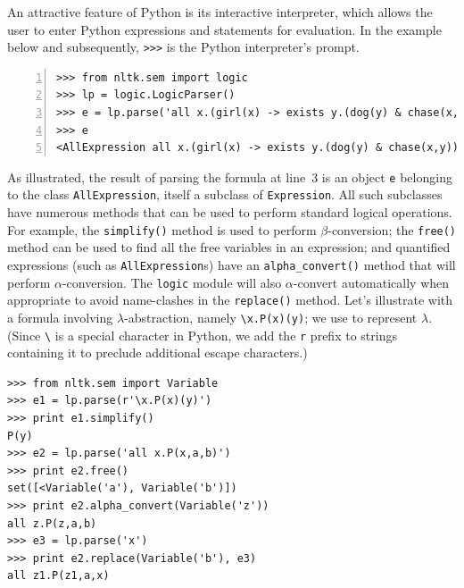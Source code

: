 \documentclass[11pt, a4paper]{article}
\newcommand{\dhgcode}[1]{{\tt #1}}
\begin{document}
An attractive feature of Python is its interactive interpreter,
which allows the user to enter Python expressions and statements for
evaluation. In the example below and subsequently, \verb!>>>! is the
Python interpreter's prompt. 
\begin{Verbatim}[numbers=left]
>>> from nltk.sem import logic
>>> lp = logic.LogicParser()
>>> e = lp.parse('all x.(girl(x) -> exists y.(dog(y) & chase(x,y)))')
>>> e
<AllExpression all x.(girl(x) -> exists y.(dog(y) & chase(x,y)))>
\end{Verbatim}
As illustrated, the result of parsing the formula at line~3 is an object
\texttt{e} belonging to the class \texttt{AllExpression}, itself a
subclass of \texttt{Expression}.  All such subclasses have numerous
methods that can be used to perform standard logical operations. For
example, the \dhgcode{simplify()} method is used to perform
$\beta$-conversion; the \dhgcode{free()} method can be used to find
all the free variables in an expression; and quantified expressions
(such as \texttt{AllExpression}s) have an \dhgcode{alpha\_convert()}
method that will perform $\alpha$-conversion.  The \texttt{logic}
module will also $\alpha$-convert automatically when appropriate to
avoid name-clashes in the \dhgcode{replace()} method. Let's illustrate
with a formula involving $\lambda$-abstraction, namely
\verb!\x.P(x)(y)!; we use \protect{\verb!\!} to represent
$\lambda$. (Since \verb!\! is a special character in Python,
we add the \texttt{r} prefix to strings containing it to preclude
additional escape characters.)
\begin{Verbatim}
>>> from nltk.sem import Variable
>>> e1 = lp.parse(r'\x.P(x)(y)')
>>> print e1.simplify()
P(y)
>>> e2 = lp.parse('all x.P(x,a,b)')
>>> print e2.free()
set([<Variable('a'), Variable('b')])
>>> print e2.alpha_convert(Variable('z'))
all z.P(z,a,b)
>>> e3 = lp.parse('x')
>>> print e2.replace(Variable('b'), e3)
all z1.P(z1,a,x)
\end{Verbatim}
\end{document}
